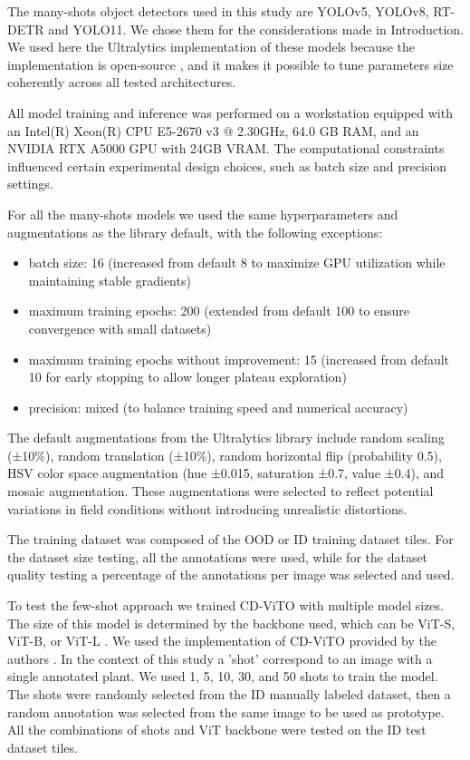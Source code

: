 \documentclass{article}
\begin{document}
The many-shots object detectors used in this study are YOLOv5, YOLOv8, RT-DETR and YOLO11.
We chose them for the considerations made in Introduction.
We used here the Ultralytics implementation of these models because the implementation is open-source \cite{jocherGitHubUltralyticsYOLO2023},
and it makes it possible to tune parameters size coherently across all tested architectures.

All model training and inference was performed on a workstation equipped with an Intel(R) Xeon(R) 
CPU E5-2670 v3 @ 2.30GHz, 64.0 GB RAM, and an NVIDIA RTX A5000 GPU with 24GB VRAM. 
The computational constraints influenced certain experimental design choices, such as 
batch size and precision settings.

For all the many-shots models we used the same hyperparameters and augmentations as the
library default, with the following exceptions:

\begin{itemize}
  \item batch size: 16 (increased from default 8 to maximize GPU utilization while maintaining stable gradients)
  \item maximum training epochs: 200 (extended from default 100 to ensure convergence with small datasets)
  \item maximum training epochs without improvement: 15 (increased from default 10 for early stopping to allow longer plateau exploration)
  \item precision: mixed (to balance training speed and numerical accuracy)
\end{itemize}

The default augmentations from the Ultralytics library include random scaling (±10\%), 
random translation (±10\%), random horizontal flip (probability 0.5), 
HSV color space augmentation (hue ±0.015, saturation ±0.7, value ±0.4), 
and mosaic augmentation. These augmentations were selected to reflect potential 
variations in field conditions without introducing unrealistic distortions.

The training dataset was composed of the OOD or ID training dataset tiles.
For the dataset size testing, all the annotations were used, while for the dataset quality testing
a percentage of the annotations per image was selected and used.

To test the few-shot approach we trained CD-ViTO with multiple model sizes.
The size of this model is determined by the backbone used, which can be ViT-S, ViT-B, or ViT-L \cite{oquabDINOv2LearningRobust2024}. 
We used the implementation of CD-ViTO provided by the authors \cite{fuCrossDomainFewShotObject2024}.
In the context of this study a 'shot' correspond to an image with a single annotated plant. 
We used 1, 5, 10, 30, and 50 shots to train the model.
The shots were randomly selected from the ID manually labeled dataset, then a 
random annotation was selected from the same image to be used as prototype.
All the combinations of shots and ViT backbone were tested on the ID test dataset tiles.
\end{document}
